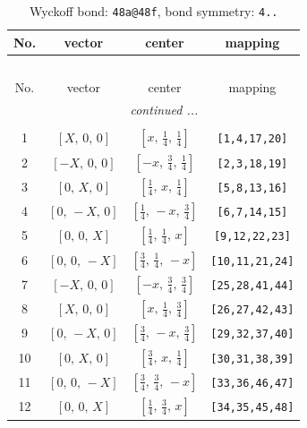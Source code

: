 \documentclass[fleqn,8pt]{jsarticle}
\begin{document}
\renewcommand{\arraystretch}{1.2}
\begin{longtable}{cccc}
\caption{Wyckoff bond: {\tt 48a@48f}, bond symmetry: {\tt 4..}}
 \\
 \hline \hline
No. & vector & center & mapping \\ \hline \endfirsthead

\multicolumn{3}{l}{\tablename\ \thetable{}} \\
 \hline \hline
No. & vector & center & mapping \\ \hline \endhead

 \hline \hline
\multicolumn{3}{r}{\footnotesize\it continued ...} \\ \endfoot

 \hline \hline
\multicolumn{3}{r}{} \\ \endlastfoot

1 & $\left[ X,\, 0,\, 0 \right]$ & $\left[ x,\, \frac{1}{4},\, \frac{1}{4} \right]$ & {\tt [1,4,17,20]} \\ \hline
2 & $\left[ - X,\, 0,\, 0 \right]$ & $\left[ - x,\, \frac{3}{4},\, \frac{1}{4} \right]$ & {\tt [2,3,18,19]} \\ \hline
3 & $\left[ 0,\, X,\, 0 \right]$ & $\left[ \frac{1}{4},\, x,\, \frac{1}{4} \right]$ & {\tt [5,8,13,16]} \\ \hline
4 & $\left[ 0,\, - X,\, 0 \right]$ & $\left[ \frac{1}{4},\, - x,\, \frac{3}{4} \right]$ & {\tt [6,7,14,15]} \\ \hline
5 & $\left[ 0,\, 0,\, X \right]$ & $\left[ \frac{1}{4},\, \frac{1}{4},\, x \right]$ & {\tt [9,12,22,23]} \\ \hline
6 & $\left[ 0,\, 0,\, - X \right]$ & $\left[ \frac{3}{4},\, \frac{1}{4},\, - x \right]$ & {\tt [10,11,21,24]} \\ \hline
7 & $\left[ - X,\, 0,\, 0 \right]$ & $\left[ - x,\, \frac{3}{4},\, \frac{3}{4} \right]$ & {\tt [25,28,41,44]} \\ \hline
8 & $\left[ X,\, 0,\, 0 \right]$ & $\left[ x,\, \frac{1}{4},\, \frac{3}{4} \right]$ & {\tt [26,27,42,43]} \\ \hline
9 & $\left[ 0,\, - X,\, 0 \right]$ & $\left[ \frac{3}{4},\, - x,\, \frac{3}{4} \right]$ & {\tt [29,32,37,40]} \\ \hline
10 & $\left[ 0,\, X,\, 0 \right]$ & $\left[ \frac{3}{4},\, x,\, \frac{1}{4} \right]$ & {\tt [30,31,38,39]} \\ \hline
11 & $\left[ 0,\, 0,\, - X \right]$ & $\left[ \frac{3}{4},\, \frac{3}{4},\, - x \right]$ & {\tt [33,36,46,47]} \\ \hline
12 & $\left[ 0,\, 0,\, X \right]$ & $\left[ \frac{1}{4},\, \frac{3}{4},\, x \right]$ & {\tt [34,35,45,48]} \\
\end{longtable}
\end{document}
